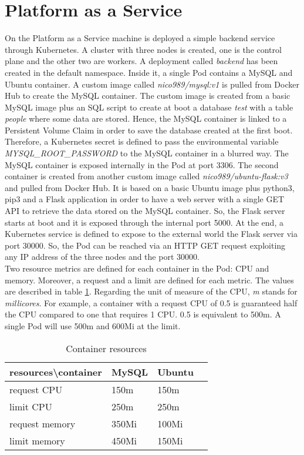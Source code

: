 \documentclass[a4paper]{article}
\begin{document}
\section{Platform as a Service}
\label{paas}
On the Platform as a Service machine is deployed a simple backend service through Kubernetes. A cluster with three nodes is created, one is the control plane and the other two are workers. A deployment called \textit{backend} has been created in the default namespace. Inside it, a single Pod contains a MySQL and Ubuntu container. A custom image called \textit{nico989/mysql:v1} is pulled from Docker Hub to create the MySQL container. The custom image is created from a basic MySQL image plus an SQL script to create at boot a database \textit{test} with a table \textit{people} where some data are stored. Hence, the MySQL container is linked to a Persistent Volume Claim in order to save the database created at the first boot. Therefore, a Kubernetes secret is defined to pass the environmental variable \textit{MYSQL\_ROOT\_PASSWORD} to the MySQL container in a blurred way. The MySQL container is exposed internally in the Pod at port 3306. The second container is created from another custom image called \textit{nico989/ubuntu-flask:v3} and pulled from Docker Hub. It is based on a basic Ubuntu image plus python3, pip3 and a Flask application in order to have a web server with a single GET API to retrieve the data stored on the MySQL container. So, the Flask server starts at boot and it is exposed through the internal port 5000. At the end, a Kubernetes service is defined to expose to the external world the Flask server via port 30000. So, the Pod can be reached via an HTTP GET request exploiting any IP address of the three nodes and the port 30000.\\
Two resource metrics are defined for each container in the Pod: CPU and memory. Moreover, a request and a limit are defined for each metric. The values are described in table \ref{res}. Regarding the unit of measure of the CPU, \textit{m} stands for \textit {millicores}. For example, a container with a request CPU of 0.5 is guaranteed half the CPU compared to one that requires 1 CPU. 0.5 is equivalent to 500m. A single Pod will use 500m and 600Mi at the limit.

\begin{table}[h]
\centering
\caption{Container resources}
\label{res}
\begin{tabular}{|l|l|l|r|}
\hline 
resources\textbackslash container & MySQL & Ubuntu\\
\hline 
request CPU & 150m & 150m \\
\hline
limit CPU & 250m & 250m \\
\hline
request memory & 350Mi & 100Mi \\
\hline
limit memory & 450Mi & 150Mi \\
\hline
\end{tabular}
\end{table}
\end{document}
